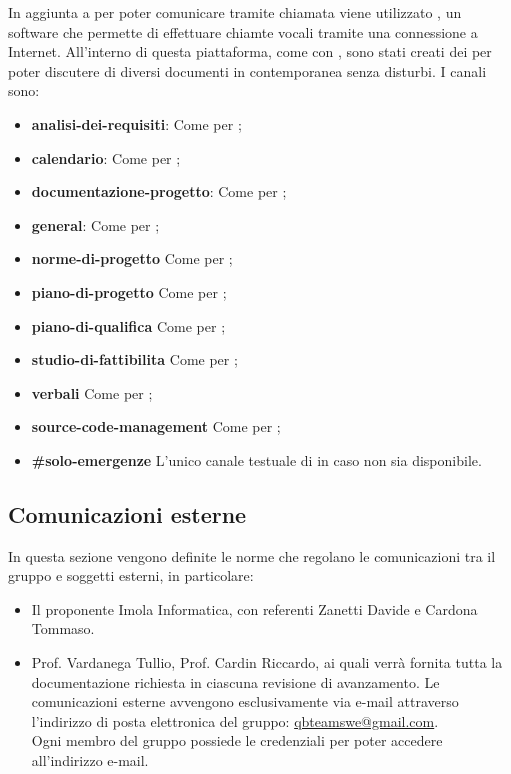 In aggiunta a  per poter comunicare tramite chiamata viene utilizzato , un software che permette di effettuare chiamte vocali tramite una connessione a Internet.
All'interno di questa piattaforma, come con , sono stati creati dei  per poter discutere di diversi documenti in contemporanea senza disturbi.
I canali sono:
\begin{itemize}
	\item \textbf{analisi-dei-requisiti}: Come per ;
	\item \textbf{calendario}: Come per ;
	\item \textbf{documentazione-progetto}: Come per ;
	\item \textbf{general}: Come per ;
	\item \textbf{norme-di-progetto} Come per ;
    \item \textbf{piano-di-progetto} Come per ;
	\item \textbf{piano-di-qualifica} Come per ;
	\item \textbf{studio-di-fattibilita} Come per ;
	\item \textbf{verbali} Come per ;
	\item \textbf{source-code-management} Come per ;
	\item \textbf{\#solo-emergenze} L'unico canale testuale di  in caso  non sia disponibile.
\end{itemize}

\subsection{Comunicazioni esterne}
In questa sezione vengono definite le norme che regolano le comunicazioni tra il gruppo e soggetti esterni, in particolare:
\begin{itemize}
	\item Il proponente Imola Informatica, con referenti Zanetti Davide e Cardona Tommaso.
	\item Prof. Vardanega Tullio, Prof. Cardin Riccardo, ai quali verrà fornita tutta la documentazione richiesta in ciascuna revisione di avanzamento.
	Le comunicazioni esterne avvengono esclusivamente via e-mail attraverso l’indirizzo di posta elettronica del gruppo:
	\url{qbteamswe@gmail.com}. \\
	Ogni membro del gruppo possiede le credenziali per poter accedere all’indirizzo e-mail.
\end{itemize}
	
